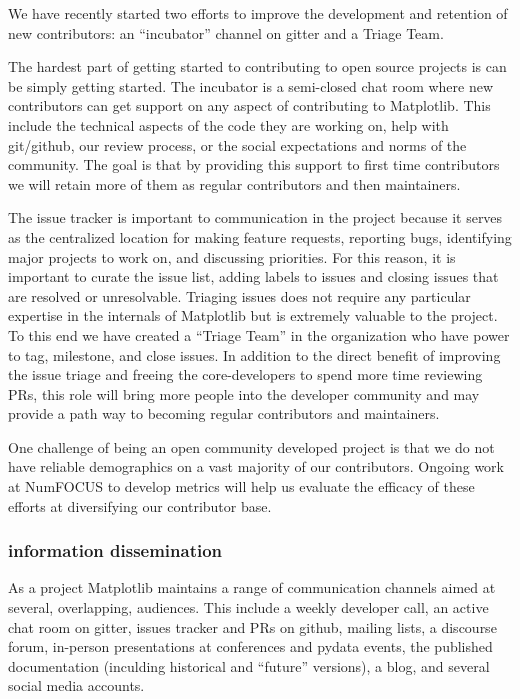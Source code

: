 \documentclass[12pt]{article}
\numberwithin{page}{section}
\begin{document}
We have recently started two efforts to improve the development and
retention of new contributors: an ``incubator'' channel on gitter and
a Triage Team.

The hardest part of getting started to contributing to open source
projects is can be simply getting started.  The incubator is a
semi-closed chat room where new contributors can get support on any
aspect of contributing to Matplotlib.  This include the technical
aspects of the code they are working on, help with git/github, our
review process, or the social expectations and norms of the community.  The
goal is that by providing this support to first time contributors we will
retain more of them as regular contributors and then maintainers.

The issue tracker is important to communication in the project because
it serves as the centralized location for making feature requests,
reporting bugs, identifying major projects to work on, and discussing
priorities.  For this reason, it is important to curate the issue
list, adding labels to issues and closing issues that are resolved or
unresolvable. Triaging issues does not require any particular
expertise in the internals of Matplotlib but is extremely valuable to
the project.  To this end we have created a ``Triage Team'' in the
organization who have power to tag, milestone, and close issues.  In
addition to the direct benefit of improving the issue triage and
freeing the core-developers to spend more time reviewing PRs, this
role will bring more people into the developer community and may
provide a path way to becoming regular contributors and maintainers.

One challenge of being an open community developed project is that we
do not have reliable demographics on a vast majority of our
contributors.  Ongoing work at NumFOCUS to develop metrics will help
us evaluate the efficacy of these efforts at diversifying our
contributor base.

\subsubsection{information dissemination}

As a project Matplotlib maintains a range of communication channels
aimed at several, overlapping, audiences.  This include a weekly
developer call, an active chat room on gitter, issues tracker and PRs
on github, mailing lists, a discourse forum, in-person presentations
at conferences and pydata events, the published documentation
(inculding historical and ``future'' versions), a blog, and several
social media accounts.
\end{document}
